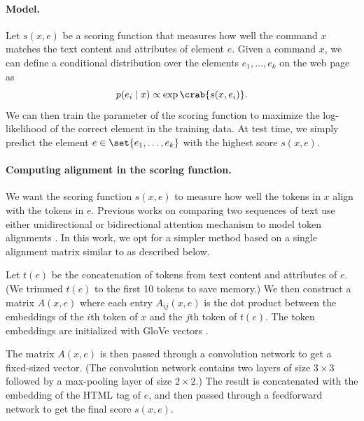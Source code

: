 \paragraph{Model.}
Let $s(x, e)$ be a scoring function
that measures how well the command $x$
matches the text content and attributes of element $e$.
Given a command $x$,
we can define a conditional distribution over
the elements $e_1,\dots,e_k$ on the web page as
\begin{equation}
p(e_i \mid x) \propto \exp\crab{s(x, e_i)}.
\end{equation}
We can then train the parameter of the scoring function
to maximize the log-likelihood of the correct element
in the training data.
At test time, we simply predict the element
$e \in \set{e_1,\dots,e_k}$ with the highest score
$s(x, e)$.

\paragraph{Computing alignment in the scoring function.}
We want the scoring function $s(x,e)$
to measure how well the tokens in $x$ align with the tokens in $e$.
Previous works
on comparing two sequences of text
use either unidirectional
or bidirectional attention mechanism
to model token alignments
\cite{seo2016bidaf,yin2016abcnn,xiong2017dynamic,yu2018qanet}.
In this work,
we opt for a simpler method based
on a single alignment matrix
similar to \cite{hu2014convolutional}
as described below.

Let $t(e)$ be the concatenation of tokens
from text content and attributes of $e$.
(We trimmed $t(e)$ to the first 10 tokens to save memory.)
We then construct a matrix $A(x,e)$
where each entry $A_{ij}(x, e)$ is the dot product
between the embeddings of the $i$th token of $x$
and the $j$th token of $t(e)$.
The token embeddings are initialized with GloVe vectors
\cite{pennington2014glove}.

The matrix $A(x,e)$ is then passed through a convolution network
to get a fixed-sized vector.
(The convolution network contains two layers of size $3 \times 3$
followed by a max-pooling layer of size $2 \times 2$.)
The result is concatenated with
the embedding of the HTML tag of $e$,
and then passed through a feedforward network
to get the final score $s(x, e)$.



